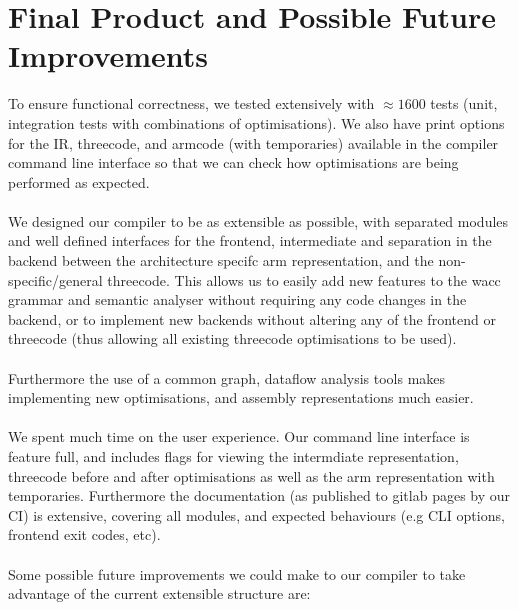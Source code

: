\documentclass{article}
\begin{document}
    \section*{Final Product and Possible Future Improvements}
        To ensure functional correctness, we tested extensively with $\approx1600$ tests (unit, integration tests with combinations of optimisations). We also have print options for the IR, threecode, and armcode (with temporaries) available in the compiler command line interface so that we can check how optimisations are being performed as expected.
        \\
        \\ We designed our compiler to be as extensible as possible, with separated modules and well defined interfaces for the frontend, intermediate and separation in the backend between the architecture specifc arm representation, and the non-specific/general threecode. This allows us to easily add new features to the wacc grammar and semantic analyser without requiring any code changes in the backend, or to implement new backends without altering any of the frontend or threecode (thus allowing all existing threecode optimisations to be used).
        \\
        \\ Furthermore the use of a common graph, dataflow analysis tools makes implementing new optimisations, and assembly representations much easier.
        \\
        \\ We spent much time on the user experience. Our command line interface is feature full, and includes flags for viewing the intermdiate representation, threecode before and after optimisations as well as the arm representation with temporaries.
        Furthermore the documentation (as published to gitlab pages by our CI) is extensive, covering all modules, and expected behaviours (e.g CLI options, frontend exit codes, etc).
        \\
        \\ Some possible future improvements we could make to our compiler to take advantage of the current extensible structure are:
\end{document}
